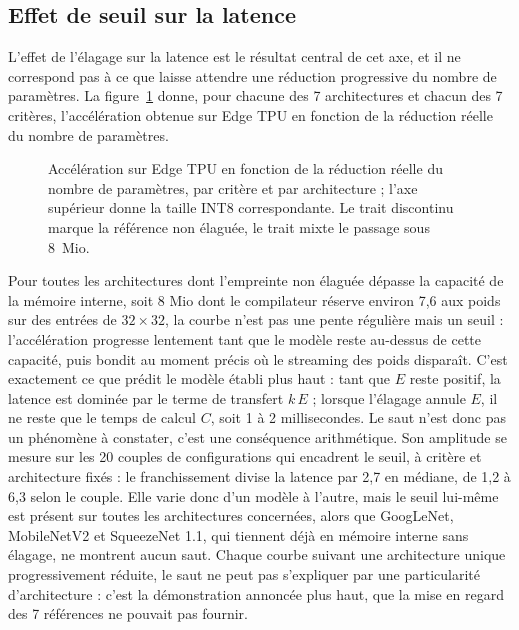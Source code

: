 \documentclass[11pt,a4paper]{report}
\begin{document}
\subsection{Effet de seuil sur la latence}

L'effet de l'élagage sur la latence est le résultat central de cet axe, et il ne correspond pas à ce que laisse attendre une réduction progressive du nombre de paramètres. La figure~\ref{fig:speedup_panel} donne, pour chacune des 7 architectures et chacun des 7 critères, l'accélération obtenue sur Edge TPU en fonction de la réduction réelle du nombre de paramètres.

\begin{figure}[H]
    \centering
    
    \caption{Accélération sur Edge TPU en fonction de la réduction réelle du nombre de paramètres, par critère et par architecture ; l'axe supérieur donne la taille INT8 correspondante. Le trait discontinu marque la référence non élaguée, le trait mixte le passage sous 8~Mio.}
    \label{fig:speedup_panel}
\end{figure}

Pour toutes les architectures dont l'empreinte non élaguée dépasse la capacité de la mémoire interne, soit 8 Mio dont le compilateur réserve environ 7,6 aux poids sur des entrées de $32 \times 32$, la courbe n'est pas une pente régulière mais un seuil : l'accélération progresse lentement tant que le modèle reste au-dessus de cette capacité, puis bondit au moment précis où le streaming des poids disparaît. C'est exactement ce que prédit le modèle établi plus haut : tant que $E$ reste positif, la latence est dominée par le terme de transfert $k\,E$ ; lorsque l'élagage annule $E$, il ne reste que le temps de calcul $C$, soit 1 à 2 millisecondes. Le saut n'est donc pas un phénomène à constater, c'est une conséquence arithmétique. Son amplitude se mesure sur les 20 couples de configurations qui encadrent le seuil, à critère et architecture fixés : le franchissement divise la latence par 2,7 en médiane, de 1,2 à 6,3 selon le couple. Elle varie donc d'un modèle à l'autre, mais le seuil lui-même est présent sur toutes les architectures concernées, alors que GoogLeNet, MobileNetV2 et SqueezeNet 1.1, qui tiennent déjà en mémoire interne sans élagage, ne montrent aucun saut. Chaque courbe suivant une architecture unique progressivement réduite, le saut ne peut pas s'expliquer par une particularité d'architecture : c'est la démonstration annoncée plus haut, que la mise en regard des 7 références ne pouvait pas fournir.
\end{document}
